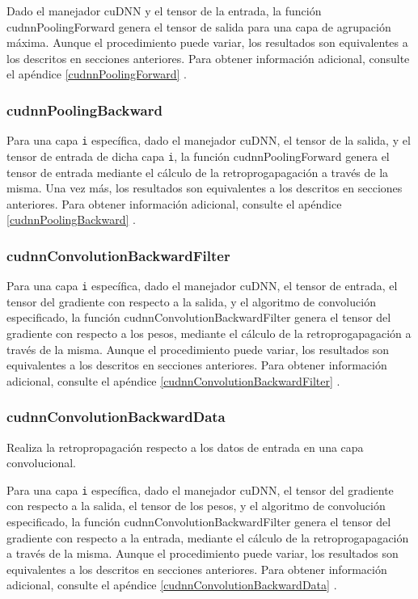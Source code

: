 Dado el manejador cuDNN y el tensor de la entrada,  la función cudnnPoolingForward genera el tensor de salida para una capa de agrupación máxima. Aunque el procedimiento puede variar, los resultados son equivalentes a los descritos en secciones anteriores. Para obtener información adicional, consulte el apéndice \ref{cudnnPoolingForward} \cite{cuDNN_pool_fwd}.

\subsubsection{cudnnPoolingBackward}

Para una capa \texttt{i} específica, dado el manejador cuDNN, el tensor de la salida, y el tensor de entrada de dicha capa \texttt{i}, la función cudnnPoolingForward genera el tensor de entrada mediante el cálculo de la retroprogapagación a través de la misma. Una vez más, los resultados son equivalentes a los descritos en secciones anteriores. Para obtener información adicional, consulte el apéndice \ref{cudnnPoolingBackward} \cite{cuDNN_pool_fwd}.

\subsubsection{cudnnConvolutionBackwardFilter}

Para una capa \texttt{i} específica, dado el manejador cuDNN, el tensor de entrada, el tensor del gradiente con respecto a la salida, y el algoritmo de convolución especificado, la función cudnnConvolutionBackwardFilter genera el tensor del gradiente con respecto a los pesos, mediante el cálculo de la retroprogapagación a través de la misma. Aunque el procedimiento puede variar, los resultados son equivalentes a los descritos en secciones anteriores. Para obtener información adicional, consulte el apéndice \ref{cudnnConvolutionBackwardFilter} \cite{cuDNN_conv_back_w}.

\subsubsection{cudnnConvolutionBackwardData}
Realiza la retropropagación respecto a los datos de entrada en una capa convolucional.

Para una capa \texttt{i} específica, dado el manejador cuDNN, el tensor del gradiente con respecto a la salida, el tensor de los pesos, y el algoritmo de convolución especificado, la función cudnnConvolutionBackwardFilter genera el tensor del gradiente con respecto a la entrada, mediante el cálculo de la retroprogapagación a través de la misma. Aunque el procedimiento puede variar, los resultados son equivalentes a los descritos en secciones anteriores. Para obtener información adicional, consulte el apéndice \ref{cudnnConvolutionBackwardData} \cite{cuDNN_conv_back_x}.

